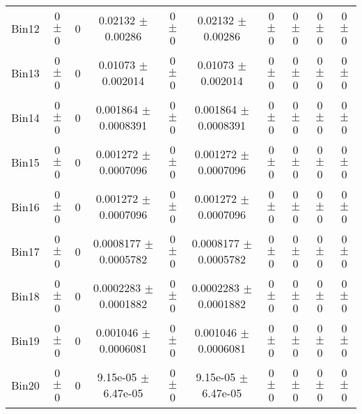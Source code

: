 \begin{tabular}{@{\extracolsep{4pt}}lccccccccc@{}}
     Bin12 & 0 $\pm$ 0 & 0 & 0.02132 $\pm$ 0.00286 & 0 $\pm$ 0 & 0.02132 $\pm$ 0.00286 & 0 $\pm$ 0 & 0 $\pm$ 0 & 0 $\pm$ 0 & 0 $\pm$ 0 \\ 
     Bin13 & 0 $\pm$ 0 & 0 & 0.01073 $\pm$ 0.002014 & 0 $\pm$ 0 & 0.01073 $\pm$ 0.002014 & 0 $\pm$ 0 & 0 $\pm$ 0 & 0 $\pm$ 0 & 0 $\pm$ 0 \\ 
     Bin14 & 0 $\pm$ 0 & 0 & 0.001864 $\pm$ 0.0008391 & 0 $\pm$ 0 & 0.001864 $\pm$ 0.0008391 & 0 $\pm$ 0 & 0 $\pm$ 0 & 0 $\pm$ 0 & 0 $\pm$ 0 \\ 
     Bin15 & 0 $\pm$ 0 & 0 & 0.001272 $\pm$ 0.0007096 & 0 $\pm$ 0 & 0.001272 $\pm$ 0.0007096 & 0 $\pm$ 0 & 0 $\pm$ 0 & 0 $\pm$ 0 & 0 $\pm$ 0 \\ 
     Bin16 & 0 $\pm$ 0 & 0 & 0.001272 $\pm$ 0.0007096 & 0 $\pm$ 0 & 0.001272 $\pm$ 0.0007096 & 0 $\pm$ 0 & 0 $\pm$ 0 & 0 $\pm$ 0 & 0 $\pm$ 0 \\ 
     Bin17 & 0 $\pm$ 0 & 0 & 0.0008177 $\pm$ 0.0005782 & 0 $\pm$ 0 & 0.0008177 $\pm$ 0.0005782 & 0 $\pm$ 0 & 0 $\pm$ 0 & 0 $\pm$ 0 & 0 $\pm$ 0 \\ 
     Bin18 & 0 $\pm$ 0 & 0 & 0.0002283 $\pm$ 0.0001882 & 0 $\pm$ 0 & 0.0002283 $\pm$ 0.0001882 & 0 $\pm$ 0 & 0 $\pm$ 0 & 0 $\pm$ 0 & 0 $\pm$ 0 \\ 
     Bin19 & 0 $\pm$ 0 & 0 & 0.001046 $\pm$ 0.0006081 & 0 $\pm$ 0 & 0.001046 $\pm$ 0.0006081 & 0 $\pm$ 0 & 0 $\pm$ 0 & 0 $\pm$ 0 & 0 $\pm$ 0 \\ 
     Bin20 & 0 $\pm$ 0 & 0 & 9.15e-05 $\pm$ 6.47e-05 & 0 $\pm$ 0 & 9.15e-05 $\pm$ 6.47e-05 & 0 $\pm$ 0 & 0 $\pm$ 0 & 0 $\pm$ 0 & 0 $\pm$ 0 \\ 
\hline\hline
  \end{tabular}
